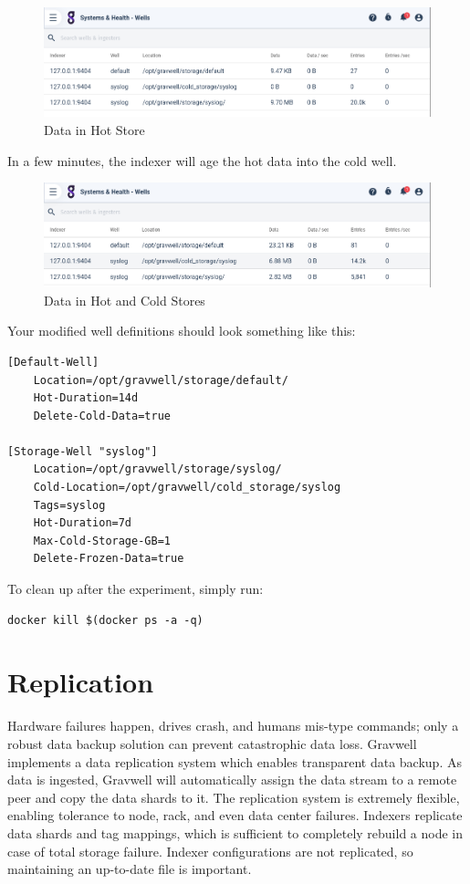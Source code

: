 {{\begin{figure}
	\includegraphics{images/hotstore.png}
	\caption{Data in Hot Store}
\end{figure}

In a few minutes, the indexer will age the hot data into the cold
well.

\begin{figure}
	\includegraphics{images/coldstore.png}
	\caption{Data in Hot and Cold Stores}
\end{figure}

Your modified  well definitions should look something
like this:

\begin{Verbatim}[breaklines=true]
[Default-Well]
    Location=/opt/gravwell/storage/default/
    Hot-Duration=14d
    Delete-Cold-Data=true

[Storage-Well "syslog"]
    Location=/opt/gravwell/storage/syslog/
    Cold-Location=/opt/gravwell/cold_storage/syslog
    Tags=syslog
    Hot-Duration=7d
    Max-Cold-Storage-GB=1
    Delete-Frozen-Data=true
\end{Verbatim}

To clean up after the experiment, simply run:

\begin{Verbatim}[breaklines=true]
docker kill $(docker ps -a -q)
\end{Verbatim}

\section{Replication}
Hardware failures happen, drives crash, and humans mis-type commands;
only a robust data backup solution can prevent catastrophic data loss.
Gravwell implements a data replication system which enables transparent
data backup. As data is ingested, Gravwell will automatically assign
the data stream to a remote peer and copy the data shards to it. The
replication system is extremely flexible, enabling tolerance to node,
rack, and even data center failures. Indexers replicate data shards and
tag mappings, which is sufficient to completely rebuild a node in case
of total storage failure. Indexer configurations are not replicated, so
maintaining an up-to-date  file is important.}

}
